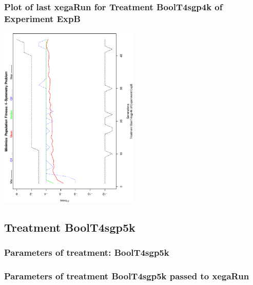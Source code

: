 \documentclass[18pt,c]{beamer}
\makeatletter
\def\beamer@writeslidentry@miniframesoff{%
  \expandafter\beamer@ifempty\expandafter{\beamer@framestartpage}{}%
  {%
   \clearpage\beamer@notesactions%
  }
}
\newcommand*{\miniframesoff}{\let\beamer@writeslidentry=\beamer@writeslidentry@miniframesoff}
\makeatother
\begin{document}
 \begin{frame}
 \frametitle{ Plot of last xegaRun for Treatment BoolT4sgp4k of Experiment ExpB }
 \begin{center}
\includegraphics[width=0.5\textwidth, angle=-90]
{ExpBPlotPopStatsFigure022.eps}
 \end{center}
 \label{report/ExpBPlotPopStatsFigure022.eps}  
 \end{frame}

\miniframesoff
\subsection{Treatment BoolT4sgp5k}

 \begin{frame}
 \fontsize{8pt}{9pt}\selectfont
 \frametitle{  Parameters of treatment: BoolT4sgp5k 
 }

 \label{ExpBtParmTable092.tex}  
 \end{frame}


 \begin{frame}
 \fontsize{8pt}{9pt}\selectfont
 \frametitle{  Parameters of treatment BoolT4sgp5k passed to xegaRun
 }

 \label{ExpBtParmTable093.tex}  
 \end{frame}
\end{document}
